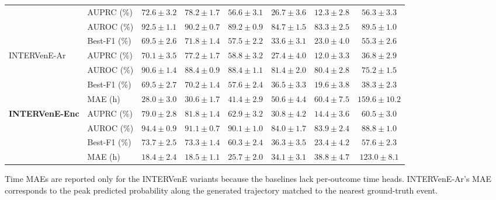 \documentclass[letterpaper]{article} %
\begin{document}
\begin{table}[t]
{\begin{tabular}{llcccccc}
      & AUPRC (\%) & $72.6 \pm 3.2$ & $78.2 \pm 1.7$ & $56.6 \pm 3.1$ & $26.7 \pm 3.6$ & $12.3 \pm 2.8$ & $56.3 \pm 3.3$ \\
      & AUROC (\%) & $92.5 \pm 1.1$ & $90.2 \pm 0.7$ & $89.2 \pm 0.9$ & $\mathbf{84.7 \pm 1.5}$ & $83.3 \pm 2.5$ & $89.5 \pm 1.0$ \\
      & Best-F1 (\%) & $69.5 \pm 2.6$ & $71.8 \pm 1.4$ & $57.5 \pm 2.2$ & $33.6 \pm 3.1$ & $23.0 \pm 4.0$ & $55.3 \pm 2.6$ \\
    \midrule
    \multirow{4}{*}{INTERVenE-Ar}
      & AUPRC (\%) & $70.1 \pm 3.5$ & $77.2 \pm 1.7$ & $58.8 \pm 3.2$ & $27.4 \pm 4.0$ & $12.0 \pm 3.3$ & $36.8 \pm 2.9$ \\
      & AUROC (\%) & $90.6 \pm 1.4$ & $88.4 \pm 0.9$ & $88.4 \pm 1.1$ & $81.4 \pm 2.0$ & $80.4 \pm 2.8$ & $75.2 \pm 1.5$ \\
      & Best-F1 (\%) & $69.5 \pm 2.7$ & $70.2 \pm 1.4$ & $57.6 \pm 2.4$ & $\mathbf{36.5 \pm 3.3}$ & $19.6 \pm 3.8$ & $38.3 \pm 2.3$ \\
      & MAE (h) & $28.0 \pm 3.0$    & $30.6 \pm 1.7$    & $41.4 \pm 2.9$    & $50.6 \pm 4.4$    & $60.4 \pm 7.5$    & $159.6 \pm 10.2$ \\
    \midrule
    \multirow{4}{*}{\textbf{INTERVenE-Enc}}
      & AUPRC (\%) & $\mathbf{79.0 \pm 2.8}$ & $\mathbf{81.8 \pm 1.4}$ & $\mathbf{62.9 \pm 3.2}$ & $\mathbf{30.8 \pm 4.2}$ & $14.4 \pm 3.6$ & $\mathbf{60.5 \pm 3.0}$ \\
      & AUROC (\%) & $\mathbf{94.4 \pm 0.9}$ & $\mathbf{91.1 \pm 0.7}$ & $\mathbf{90.1 \pm 1.0}$ & $84.0 \pm 1.7$ & $\mathbf{83.9 \pm 2.4}$ & $88.8 \pm 1.0$ \\
      & Best-F1 (\%) & $\mathbf{73.7 \pm 2.5}$ & $\mathbf{73.3 \pm 1.4}$ & $\mathbf{60.3 \pm 2.4}$ & $36.3 \pm 3.5$ & $23.4 \pm 4.2$ & $\mathbf{57.6 \pm 2.3}$ \\
      & MAE (h) & $18.4 \pm 2.4$    & $18.5 \pm 1.1$    & $25.7 \pm 2.0$    & $34.1 \pm 3.1$    & $38.8 \pm 4.7$    & $123.0 \pm 8.1$ \\
    \bottomrule
  \end{tabular}%
  }

  \smallskip
  \footnotesize Time MAEs are reported only for the INTERVenE variants because the baselines lack per-outcome time heads. INTERVenE-Ar's MAE corresponds to the peak predicted probability along the generated trajectory matched to the nearest ground-truth event.
\end{table}
\end{document}

